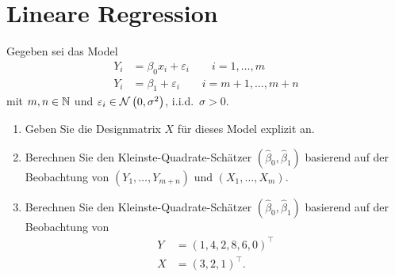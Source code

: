 \section{Lineare Regression}


 Gegeben sei das Model
\begin{align*}
    Y_i &=  \beta_0 x_i + \varepsilon_i \quad\quad i=1,\ldots ,m \\
    Y_i &= \beta_1 + \varepsilon_i \quad\quad  i=m+1, \ldots , m+n
\end{align*}
mit $m,n \in \mathbb N$ und $\varepsilon_i \in \mathcal N \left( 0, \sigma^2 \right)$, i.i.d.\ $\sigma>0$.
\begin{enumerate}
    \item Geben Sie die Designmatrix $X$ für dieses Model explizit an.
    \item Berechnen Sie den Kleinste-Quadrate-Schätzer $\left( \hat \beta_0, \hat \beta_1 \right)$ 
        basierend auf der Beobachtung von  
        $\left( Y_1, \ldots , Y_{m+n} \right)$ und $\left( X_1, \ldots , X_m \right)$.
    \item Berechnen Sie den Kleinste-Quadrate-Schätzer $\left( \hat \beta_0,
        \hat \beta_1 \right)$ basierend auf der Beobachtung von
        \begin{align*}
            Y &= \left( 1,4,2,8,6,0 \right)^\top \\
            X &= \left( 3,2,1 \right)^\top.
        \end{align*}
\end{enumerate}

